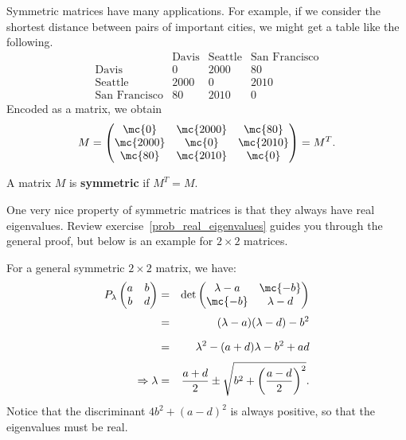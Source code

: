 
\chapter{\diagSymMatTitle}\label{symmetricmatrices}

Symmetric matrices have many applications.  For example, if we consider the shortest distance between pairs of important cities, we might get a table like the following.
\[
\begin{array}{c|ccc}
 & \text{Davis} & \text{Seattle} 
& \text{San Francisco} \\ \hline
\text{Davis} & 0 & 2000 & 80 \\
\text{Seattle} & 2000 & 0 & 2010 \\
\text{San Francisco} & 80 & 2010 & 0
\end{array}
\]
Encoded as a matrix, we obtain
\[
M=\begin{pmatrix}
\mc{0} & \mc{2000} & \mc{80} \\
\mc{2000} & \mc{0} & \mc{2010} \\
\mc{80} & \mc{2010} & \mc{0}
\end{pmatrix}=M^T.
\]

\begin{definition}
A matrix $M$ is {\bfseries symmetric} if  $M^T=M.$
\end{definition}

One very nice property of symmetric matrices is that they always have real eigenvalues.  Review exercise~\ref{prob_real_eigenvalues} guides you through the general proof, but below is an example for $2\times 2$ matrices.

\begin{example}
For a general symmetric $2\times 2$ matrix, we have:
\begin{eqnarray*}
P_\lambda \begin{pmatrix} a & b \\ b& d \end{pmatrix}
 &=&
\det\begin{pmatrix}\lambda-a&\mc{-b}\\\mc{-b}&\lambda-d \end{pmatrix}\\[1mm]
&=& (\lambda-a)(\lambda-d)-b^2 \\[2mm]
&=& \lambda^2-(a+d)\lambda-b^2+ad\\[1mm]
\Rightarrow \lambda &=& \frac{a+d}{2}\pm \sqrt{b^2+\left(\frac{a-d}{2}\right)^2}.
\end{eqnarray*}
Notice that the discriminant $4b^2+(a-d)^2$ is always positive, so that the eigenvalues must be real.
\end{example}

